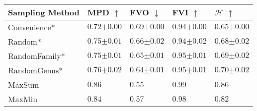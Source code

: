 \begin{tabular}{lllll}
	\toprule
	\textbf{Sampling Method} & \textbf{MPD} $\uparrow$           & \textbf{FVO} $\downarrow$         & \textbf{FVI} $\uparrow$           & $\boldsymbol{\mathcal{H}}$ $\uparrow$ \\\midrule
	Convenience*             & $0.72 {\scriptscriptstyle\pm0.00}$ & $0.69 {\scriptscriptstyle\pm0.00}$ & $0.94 {\scriptscriptstyle\pm0.00}$ & $0.65 {\scriptscriptstyle\pm0.00}$     \\
	Random*                  & $0.75 {\scriptscriptstyle\pm0.01}$ & $0.66 {\scriptscriptstyle\pm0.02}$ & $0.94 {\scriptscriptstyle\pm0.02}$ & $0.68 {\scriptscriptstyle\pm0.02}$     \\
	RandomFamily*            & $0.75 {\scriptscriptstyle\pm0.01}$ & $0.65 {\scriptscriptstyle\pm0.01}$ & $0.95 {\scriptscriptstyle\pm0.01}$ & $0.69 {\scriptscriptstyle\pm0.02}$     \\
	RandomGenus*             & $0.76 {\scriptscriptstyle\pm0.02}$ & $0.64 {\scriptscriptstyle\pm0.01}$ & $0.95 {\scriptscriptstyle\pm0.01}$ & $0.70 {\scriptscriptstyle\pm0.02}$     \\\midrule
	MaxSum                   & $\mathbf{0.86}$                   & $\mathbf{0.55}$                   & $\mathbf{0.99}$                            & $\mathbf{0.86}$                                \\
	MaxMin                   & $0.84$                            & $0.57$                            & $0.98$                   & $0.82$                       \\\bottomrule
\end{tabular}
